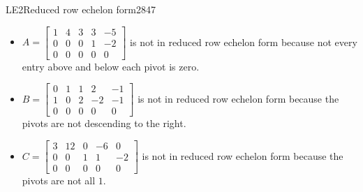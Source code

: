\begin{exercise}{LE2}{Reduced row echelon form}{2847}
\begin{exerciseAnswer}
\begin{itemize}
\item  

 \(A=\left[\begin{array}{ccccc}
1 & 4 & 3 & 3 & -5 \\
0 & 0 & 0 & 1 & -2 \\
0 & 0 & 0 & 0 & 0
\end{array}\right]\) is not in reduced row echelon form because not every entry above and below each pivot is zero. 

 
\item  

 \(B=\left[\begin{array}{ccccc}
0 & 1 & 1 & 2 & -1 \\
1 & 0 & 2 & -2 & -1 \\
0 & 0 & 0 & 0 & 0
\end{array}\right]\) is not in reduced row echelon form because the pivots are not descending to the right. 

 
\item  

 \(C=\left[\begin{array}{ccccc}
3 & 12 & 0 & -6 & 0 \\
0 & 0 & 1 & 1 & -2 \\
0 & 0 & 0 & 0 & 0
\end{array}\right]\) is not in reduced row echelon form because the pivots are not all \(1\). 

 
\end{itemize}

     \end{exerciseAnswer}
 \end{exercise}


